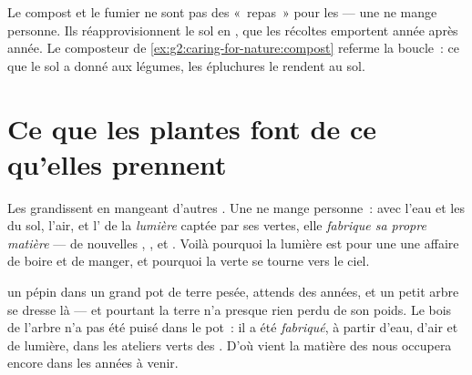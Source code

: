 \begin{remark}\label{rem:g4:what-plants-need:soil}
Le compost et le fumier ne sont pas des «~repas~» pour les 
--- une  ne mange personne. Ils réapprovisionnent le sol en
, que les récoltes emportent année après année. Le
composteur de \cref{ex:g2:caring-for-nature:compost} referme la
boucle~: ce que le sol a donné aux légumes, les épluchures le
rendent au sol.
\end{remark}

\section{Ce que les plantes font de ce qu'elles prennent}

\begin{proposition}\label{prop:g4:what-plants-need:make}
Les  grandissent en mangeant d'autres . Une
 ne mange personne~: avec l'eau et les  du sol,
l'air, et l' de la \emph{lumière} captée par ses 
vertes, elle \emph{fabrique sa propre matière} --- de nouvelles
, ,  et . Voilà pourquoi la lumière est
pour une  une affaire de boire et de manger, et pourquoi la
 verte se tourne vers le ciel.
\end{proposition}
\admitted

\begin{example}\label{ex:g4:what-plants-need:tree}
 un pépin dans un grand pot de terre pesée, attends des
années, et un petit arbre se dresse là --- et pourtant la terre n'a
presque rien perdu de son poids. Le bois de l'arbre n'a pas été
puisé dans le pot~: il a été \emph{fabriqué}, à partir d'eau, d'air
et de lumière, dans les ateliers verts des . D'où vient la
matière des  nous occupera encore dans les années à
venir.
\end{example}

